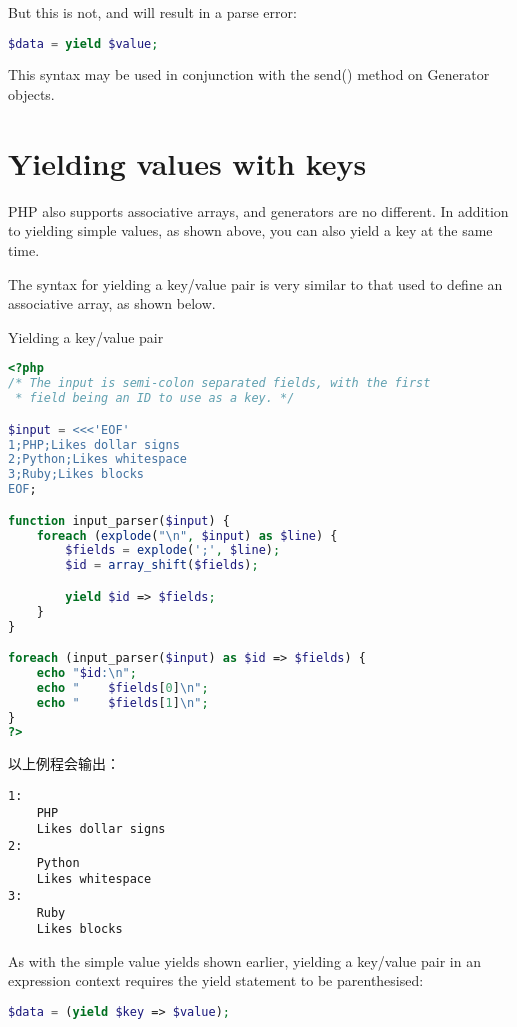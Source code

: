 But this is not, and will result in a parse error:

\begin{lstlisting}[language=PHP]
$data = yield $value;
\end{lstlisting}

This syntax may be used in conjunction with the send() method on Generator objects.


\section{Yielding values with keys}


PHP also supports associative arrays, and generators are no different. In addition to yielding simple values, as shown above, you can also yield a key at the same time.

The syntax for yielding a key/value pair is very similar to that used to define an associative array, as shown below.



\begin{example}
Yielding a key/value pair
\begin{lstlisting}[language=PHP]
<?php
/* The input is semi-colon separated fields, with the first
 * field being an ID to use as a key. */

$input = <<<'EOF'
1;PHP;Likes dollar signs
2;Python;Likes whitespace
3;Ruby;Likes blocks
EOF;

function input_parser($input) {
    foreach (explode("\n", $input) as $line) {
        $fields = explode(';', $line);
        $id = array_shift($fields);

        yield $id => $fields;
    }
}

foreach (input_parser($input) as $id => $fields) {
    echo "$id:\n";
    echo "    $fields[0]\n";
    echo "    $fields[1]\n";
}
?>
\end{lstlisting}
\end{example}

以上例程会输出：

\begin{verbatim}
1:
    PHP
    Likes dollar signs
2:
    Python
    Likes whitespace
3:
    Ruby
    Likes blocks
\end{verbatim}

As with the simple value yields shown earlier, yielding a key/value pair in an expression context requires the yield statement to be parenthesised:

\begin{lstlisting}[language=PHP]
$data = (yield $key => $value);
\end{lstlisting}


